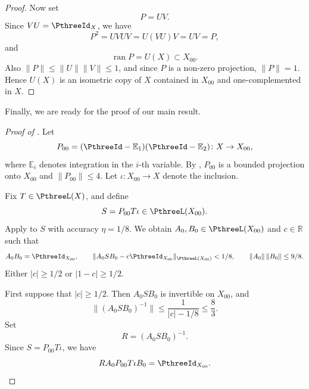 \documentclass[11pt,reqno]{amsart}
\makeatletter
\theoremstyle{plain}
\theoremstyle{definition}
\newcounter{problempaper}
\newenvironment{problempaperbody}{%
  \setcounter{subsection}{0}%
  \setcounter{subsubsection}{0}%
  \setcounter{paragraph}{0}%
  \renewcommand{\thesubsection}{\arabic{subsection}}%
  \renewcommand{\thesubsubsection}{\thesubsection.\arabic{subsubsection}}%
  \renewcommand{\theparagraph}{\thesubsubsection.\arabic{paragraph}}%
  \let\problem@outersection\section
  \let\problem@outersubsection\subsection
  \let\problem@outersubsubsection\subsubsection
  \let\problem@outerparagraph\paragraph
  \let\section\problem@papersection
  \let\subsection\problem@papersubsection
  \let\subsubsection\problem@papersubsubsection
}{%
  \let\section\problem@outersection
  \let\subsection\problem@outersubsection
  \let\subsubsection\problem@outersubsubsection
  \let\paragraph\problem@outerparagraph
}
\newcommand{\problem@target}[2]{%
  \hypertarget{problem-\theproblempaper-#1-#2}{}%
}
\newcommand{\problem@paperheading}[3]{%
  \par\bigskip
  \problem@target{#1}{#2}%
  \noindent{\large\bfseries #2.\quad #3\par}%
  \nobreak\smallskip
}
\newcommand{\problem@papersubheading}[3]{%
  \par\medskip
  \problem@target{#1}{#2}%
  \noindent{\normalsize\bfseries #2.\quad #3\par}%
  \nobreak\smallskip
}
\newcommand{\problem@papersubsubheading}[3]{%
  \par\smallskip
  \problem@target{#1}{#2}%
  \noindent{\normalsize\itshape #2.\quad #3.\ }%
}
\def\problem@papersection{%
  \@ifstar{\problem@papersectionstar}{\problem@papersectionnostar}%
}
\def\problem@papersectionstar#1{%
  \par\bigskip\noindent{\large\bfseries #1\par}\nobreak\smallskip
}
\def\problem@papersectionnostar#1{%
  \refstepcounter{subsection}%
  \setcounter{subsubsection}{0}%
  \setcounter{paragraph}{0}%
  \problem@paperheading{section}{\thesubsection}{#1}%
  \problem@writecontentsline{section}{\thesubsection}{#1}%
}
\def\problem@papersubsection{%
  \@ifstar{\problem@papersubsectionstar}{\problem@papersubsectionnostar}%
}
\def\problem@papersubsectionstar#1{%
  \par\medskip\noindent{\normalsize\bfseries #1\par}\nobreak\smallskip
}
\def\problem@papersubsectionnostar#1{%
  \refstepcounter{subsubsection}%
  \setcounter{paragraph}{0}%
  \problem@papersubheading{subsection}{\thesubsubsection}{#1}%
  \problem@writecontentsline{subsection}{\thesubsubsection}{#1}%
}
\def\problem@papersubsubsection{%
  \@ifstar{\problem@papersubsubsectionstar}{\problem@papersubsubsectionnostar}%
}
\def\problem@papersubsubsectionstar#1{%
  \par\smallskip\noindent{\normalsize\itshape #1.\ }%
}
\def\problem@papersubsubsectionnostar#1{%
  \refstepcounter{paragraph}%
  \problem@papersubsubheading{subsubsection}{\theparagraph}{#1}%
  \problem@writecontentsline{subsubsection}{\theparagraph}{#1}%
}
\newcommand{\problem@writecontentsline}[3]{%
  \begingroup
  \protected@write\@auxout{}{%
    \string\problemcontentsentry{\theproblempaper}{#1}{#2}{#3}{\thepage}%
  }%
  \endgroup
}
\newcommand{\problemcontentsentry}[5]{%
  \@ifundefined{problemcontents@#1}{%
    \expandafter\gdef\csname problemcontents@#1\endcsname{}%
  }{}%
  \expandafter\g@addto@macro\csname problemcontents@#1\endcsname{%
    \problemcontentsline{#1}{#2}{#3}{#4}{#5}%
  }%
}
\newcommand{\problemcontentslink}[4]{%
  \hyperlink{problem-#1-#2-#3}{#4}%
}
\newcommand{\problemcontentsline}[5]{%
  \ifstrequal{#2}{section}{%
    \par\noindent
    \problemcontentslink{#1}{#2}{#3}{\makebox[2.5em][l]{#3}#4}%
    \nobreak\dotfill
    \problemcontentslink{#1}{#2}{#3}{#5}\par
  }{%
    \ifstrequal{#2}{subsection}{%
      \par\noindent\hspace*{1.5em}%
      \problemcontentslink{#1}{#2}{#3}{\makebox[3.5em][l]{#3}#4}%
      \nobreak\dotfill
      \problemcontentslink{#1}{#2}{#3}{#5}\par
    }{%
      \par\noindent\hspace*{3em}%
      \problemcontentslink{#1}{#2}{#3}{\makebox[4.5em][l]{#3}#4}%
      \nobreak\dotfill
      \problemcontentslink{#1}{#2}{#3}{#5}\par
    }%
  }%
}
\makeatother
\begin{document}
\begin{problempaperbody}
\begin{proof}
Now set
\begin{equation*}
        P=UV .
\end{equation*}
Since $VU=\PthreeId_X$, we have
\begin{equation*}
        P^2=UVUV=U(VU)V=UV=P,
\end{equation*}
and
\begin{equation*}
        \operatorname{ran} P=U(X)\subset X_{00}.
\end{equation*}
Also $\|P\|\leq\|U\|\|V\|\leq1$, and since $P$ is a non-zero projection, $\|P\|=1$. Hence $U(X)$ is an isometric copy of $X$ contained in $X_{00}$ and one-complemented in $X$.
\end{proof}

Finally, we are ready for the proof of our main result.

\begin{proof}[Proof of ]
Let
\begin{equation*}
        P_{00}=(\PthreeId-\mathbb E_1)(\PthreeId-\mathbb E_2)\colon X\to X_{00},
\end{equation*}
where $\mathbb E_i$ denotes integration in the $i$-th variable. By , $P_{00}$ is a bounded projection onto $X_{00}$ and $\|P_{00}\|\leq4$. Let $\iota\colon X_{00}\to X$ denote the inclusion.

Fix $T\in\PthreeL(X)$, and define
\begin{equation*}
        S=P_{00}T\iota\in\PthreeL(X_{00}).
\end{equation*}
Apply  to $S$ with accuracy $\eta=1/8$. We obtain $A_0,B_0\in\PthreeL(X_{00})$ and $c\in\mathbb R$ such that
\begin{equation*}
        A_0B_0=\PthreeId_{X_{00}},\qquad \|A_0SB_0-c\PthreeId_{X_{00}}\|_{\PthreeL(X_{00})}<1/8,\qquad \|A_0\|\,\|B_0\|\leq 9/8.
\end{equation*}
Either $|c|\geq1/2$ or $|1-c|\geq1/2$.

First suppose that $|c|\geq1/2$. Then $A_0SB_0$ is invertible on $X_{00}$, and
\begin{equation*}
        \|(A_0SB_0)^{-1}\|\leq \frac1{|c|-1/8}\leq \frac83.
\end{equation*}
Set
\begin{equation*}
        R=(A_0SB_0)^{-1}.
\end{equation*}
Since $S=P_{00}T\iota$, we have
\begin{equation*}
        RA_0P_{00}T\iota B_0=\PthreeId_{X_{00}}.
\end{equation*}


\end{proof}
\end{problempaperbody}
\end{document}
